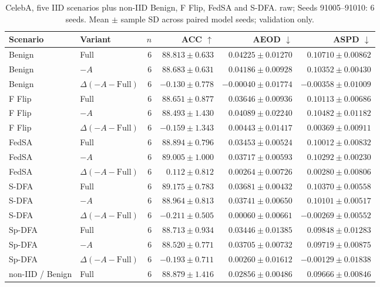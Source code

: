 \begin{table}[t]
\centering
\small
\caption{CelebA, five IID scenarios plus non-IID Benign, F Flip, FedSA and S-DFA. raw; Seeds 91005–91010: 6 seeds. Mean $\pm$ sample SD across paired model seeds; validation only.}
\begin{tabular}{llrrrr}
\toprule
Scenario & Variant & $n$ & ACC $\uparrow$ & AEOD $\downarrow$ & ASPD $\downarrow$ \\
\midrule
Benign & Full & 6 & $88.813 \pm 0.633$ & $0.04225 \pm 0.01270$ & $0.10710 \pm 0.00862$ \\
Benign & $-A$ & 6 & $88.683 \pm 0.631$ & $0.04186 \pm 0.00928$ & $0.10352 \pm 0.00430$ \\
Benign & $\Delta(-A-\mathrm{Full})$ & 6 & $-0.130 \pm 0.778$ & $-0.00040 \pm 0.01774$ & $-0.00358 \pm 0.01009$ \\
F Flip & Full & 6 & $88.651 \pm 0.877$ & $0.03646 \pm 0.00936$ & $0.10113 \pm 0.00686$ \\
F Flip & $-A$ & 6 & $88.493 \pm 1.430$ & $0.04089 \pm 0.02240$ & $0.10482 \pm 0.01182$ \\
F Flip & $\Delta(-A-\mathrm{Full})$ & 6 & $-0.159 \pm 1.343$ & $0.00443 \pm 0.01417$ & $0.00369 \pm 0.00911$ \\
FedSA & Full & 6 & $88.894 \pm 0.796$ & $0.03453 \pm 0.00524$ & $0.10012 \pm 0.00832$ \\
FedSA & $-A$ & 6 & $89.005 \pm 1.000$ & $0.03717 \pm 0.00593$ & $0.10292 \pm 0.00230$ \\
FedSA & $\Delta(-A-\mathrm{Full})$ & 6 & $0.112 \pm 0.812$ & $0.00264 \pm 0.00726$ & $0.00280 \pm 0.00806$ \\
S-DFA & Full & 6 & $89.175 \pm 0.783$ & $0.03681 \pm 0.00432$ & $0.10370 \pm 0.00558$ \\
S-DFA & $-A$ & 6 & $88.964 \pm 0.813$ & $0.03741 \pm 0.00650$ & $0.10101 \pm 0.00517$ \\
S-DFA & $\Delta(-A-\mathrm{Full})$ & 6 & $-0.211 \pm 0.505$ & $0.00060 \pm 0.00661$ & $-0.00269 \pm 0.00552$ \\
Sp-DFA & Full & 6 & $88.713 \pm 0.934$ & $0.03446 \pm 0.01385$ & $0.09848 \pm 0.01283$ \\
Sp-DFA & $-A$ & 6 & $88.520 \pm 0.771$ & $0.03705 \pm 0.00732$ & $0.09719 \pm 0.00875$ \\
Sp-DFA & $\Delta(-A-\mathrm{Full})$ & 6 & $-0.193 \pm 0.711$ & $0.00260 \pm 0.01612$ & $-0.00129 \pm 0.01838$ \\
non-IID / Benign & Full & 6 & $88.879 \pm 1.416$ & $0.02856 \pm 0.00486$ & $0.09666 \pm 0.00846$ \\

\end{tabular}
\end{table}
